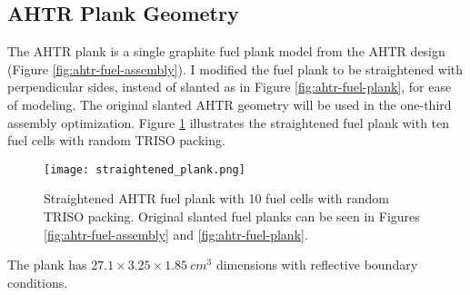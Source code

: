 \subsection{AHTR Plank Geometry}
\label{sec:ahtr-plank-geometry}
The \gls{AHTR} plank is a single graphite fuel plank model from the \gls{AHTR} design 
(Figure \ref{fig:ahtr-fuel-assembly}). 
I modified the fuel plank to be straightened with perpendicular sides, instead 
of slanted as in Figure \ref{fig:ahtr-fuel-plank}, for ease of modeling. 
The original slanted \gls{AHTR} geometry will be used in the one-third assembly 
optimization. 
Figure \ref{fig:straightened_plank} illustrates the straightened fuel plank with 
ten fuel cells with random \gls{TRISO} packing.
\begin{figure}[htbp]
    \centering
    \texttt{[image: straightened\_plank.png]}
    \raggedright
    \caption{Straightened \acrfull{AHTR} fuel plank with 10 fuel cells with random 
    TRISO packing. Original slanted fuel planks can be seen in Figures 
    \ref{fig:ahtr-fuel-assembly} and \ref{fig:ahtr-fuel-plank}.}
    \label{fig:straightened_plank}
\end{figure}
The plank has $27.1 \times 3.25 \times 1.85\ cm^3$ dimensions with reflective 
boundary conditions.

